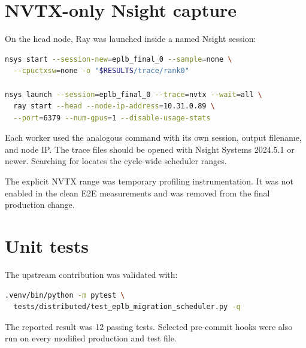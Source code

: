 \section{NVTX-only Nsight capture}

On the head node, Ray was launched inside a named Nsight session:

\begin{lstlisting}[style=code,language=bash]
nsys start --session-new=eplb_final_0 --sample=none \
  --cpuctxsw=none -o "$RESULTS/trace/rank0"

nsys launch --session=eplb_final_0 --trace=nvtx --wait=all \
  ray start --head --node-ip-address=10.31.0.89 \
  --port=6379 --num-gpus=1 --disable-usage-stats
\end{lstlisting}

Each worker used the analogous command with its own session, output filename,
and node IP. The trace files should be opened with Nsight Systems 2024.5.1 or
newer. Searching for  locates the
cycle-wide scheduler ranges.

The explicit NVTX range was temporary profiling instrumentation. It was not
enabled in the clean E2E measurements and was removed from the final
production change.

\section{Unit tests}

The upstream contribution was validated with:

\begin{lstlisting}[style=code,language=bash]
.venv/bin/python -m pytest \
  tests/distributed/test_eplb_migration_scheduler.py -q
\end{lstlisting}

The reported result was 12 passing tests. Selected pre-commit hooks were also
run on every modified production and test file.
